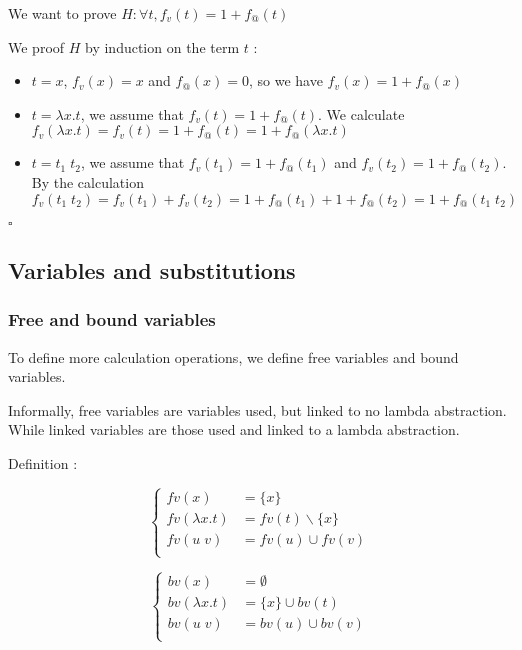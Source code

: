 \documentclass{article}
\theoremstyle{plain}
\theoremstyle{plain}
\renewcommand\qedsymbol{$\square$}
\begin{document}
  \exam We want to prove $H : \forall t, f_v(t) = 1 + f_@(t) $

  \proof We proof $H$ by induction on the term $t$ :

  \begin{itemize}
    \item $t = x$, $f_v(x) = x$ and $f_@(x) = 0$, so we have $f_v(x) = 1 +
      f_@(x)$

    \item $t = \lambda x. t$, we assume that $f_v(t) = 1 + f_@(t)$.
      We calculate $f_v(\lambda x. t) = f_v(t) = 1 + f_@(t) = 1 + f_@(\lambda
      x.t)$

    \item $t = t_1\; t_2$, we assume that $f_v(t_1) = 1 + f_@(t_1)$ and
      $f_v(t_2) = 1 + f_@(t_2)$. By the calculation $f_v(t_1\; t_2) = f_v(t_1) +
      f_v(t_2) = 1 + f_@(t_1) + 1 + f_@(t_2) = 1 + f_@(t_1\; t_2)$
  \end{itemize}
  \qedsymbol

  \subsection{Variables and substitutions}

  \subsubsection{Free and bound variables}

  To define more calculation operations, we define free variables and bound
  variables.

  Informally, free variables are variables used, but linked to no lambda
  abstraction. While linked variables are those used and linked to a lambda
  abstraction.

  Definition :

  \begin{multicols}{2}
    \[
      \begin{cases}
        fv(x) &= \{x\} \\
        fv(\lambda x. t) &= fv(t)\backslash \{x\} \\
        fv(u\; v) &= fv(u) \cup fv(v) \\
      \end{cases}
    \]

    \[
      \begin{cases}
        bv(x) &= \emptyset \\
        bv(\lambda x. t) &= \{x\} \cup bv(t) \\
        bv(u\; v) &= bv(u) \cup bv(v) \\
      \end{cases}
    \]
  \end{multicols}
\end{document}
